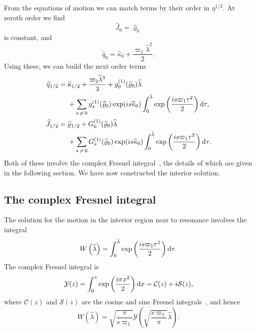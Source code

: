 From the equations of motion we can match terms by their order in $\eta^{1/2}$. At zeroth order we find
\begin{equation}
\widehat{J}_0 = \widehat{\varrho}_0
\end{equation}
is constant, and
\begin{equation}
\widehat{q}_0 = \widehat{\kappa}_0 + \dfrac{\varpi_1\widehat{\lambda}^2}{2}.
\end{equation}
Using these, we can build the next order terms
\begin{align}
\widehat{q}_{1/2} = {} & \widehat{\kappa}_{1/2} + \dfrac{\varpi_2\widehat{\lambda}^3}{3} + g_0^{(1)}(\widehat{\varrho}_0)\widehat{\lambda} \nonumber \\ 
 {} & + \sum_{s\,\neq\,0}g_s^{(1)}(\widehat{\varrho}_0)\exp(is \widehat{\kappa}_0)\int_{0}^{\hat{\lambda}}{\exp\left(\dfrac{is \varpi_1\tau^2}{2}\right)}\,\mathrm{d}{\tau}, \\
\widehat{J}_{1/2} = {} & \widehat{\varrho}_{1/2} + G_0^{(1)}(\widehat{\varrho}_0)\widehat{\lambda} \nonumber \\
 {} & + \sum_{s\,\neq\,0}G_s^{(1)}(\widehat{\varrho}_0)\exp(is \widehat{\kappa}_0)\int_{0}^{\hat{\lambda}}{\exp\left(\dfrac{is \varpi_1\tau^2}{2}\right)}\,\mathrm{d}{\tau}.
\end{align}
Both of these involve the complex Fresnel integral~\cite{Olver2010}, the details of which are given in the following section. We have now constructed the interior solution. %

\subsection{The complex Fresnel integral}

The solution for the motion in the interior region near to resonance involves the integral
\begin{equation}
W\left(\widehat{\lambda}\right) = \int_{0}^{\hat{\lambda}}{\exp\left(\dfrac{is \varpi_1\tau^2}{2}\right)}\,\mathrm{d}{\tau}.
\end{equation}
The complex Fresnel integral is
\begin{equation}
\mathcal{Y}(z) = \int_{0}^{z}{\exp\left(\dfrac{i\pi x^2}{2}\right)}\,\mathrm{d}{x} = \mathcal{C}(z) + i\mathcal{S}(z),
\end{equation}
where $\mathcal{C}(z)$ and $\mathcal{S}(z)$ are the cosine and sine Fresnel integrals~\cite{Olver2010}, and hence %
\begin{equation}
W\left(\widehat{\lambda}\right) = \sqrt{\dfrac{\pi}{s\varpi_1}}\mathcal{Y}\left(\sqrt{\dfrac{s\varpi_1}{\pi}}\widehat{\lambda}\right).
\end{equation}

